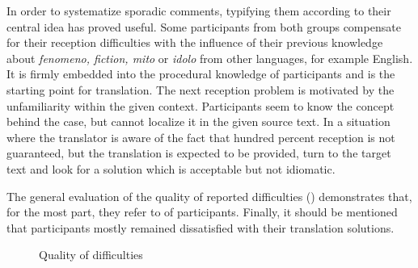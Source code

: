 \documentclass[output=paper]{langsci/langscibook.cls}
\begin{document}
In order to systematize sporadic comments, typifying them according to their central idea has proved useful. Some participants from both groups compensate for their reception difficulties with the influence of their previous knowledge about \textit{fenomeno, fiction, mito} or \textit{idolo} from other languages, for example English. It is firmly embedded into the procedural knowledge of participants and is the starting point for translation. The next reception problem is motivated by the unfamiliarity within the given context. Participants seem to know the concept behind the case, but cannot localize it in the given source text. In a situation where the translator is aware of the fact that hundred percent reception is not guaranteed, but the translation is expected to be provided,  turn to the target text and look for a solution which is acceptable but not idiomatic. 

The general evaluation of the quality of reported difficulties () demonstrates that, for the most part, they refer to  of participants. Finally, it should be mentioned that participants mostly remained dissatisfied with their translation solutions. 

\begin{figure}
    \caption{Quality of difficulties}
    \label{kloster:fig:5}
\end{figure}
\end{document}
